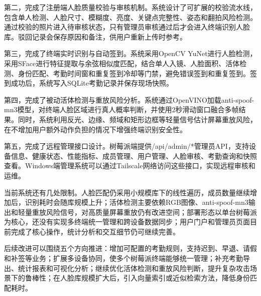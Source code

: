 \documentclass[UTF8]{heuthesis}
\begin{document}
第二，完成了注册端人脸质量校验与审核机制。系统设计了可扩展的校验流水线，包含单人检测、人脸尺寸、模糊度、亮度、关键点完整性、姿态和翻拍风险检测。通过校验的照片进入待审核状态，只有管理员审核通过后才会进入终端识别人脸库。驳回记录会保存原因和备注，供用户重新上传时参考。

第三，完成了终端实时识别与自动签到。系统采用OpenCV YuNet进行人脸检测，采用SFace进行特征提取与余弦相似度匹配，结合单人入镜、人脸面积、活体检测、身份匹配、考勤时间窗和重复签到冷却等门禁，避免错误签到和重复签到。签到成功后，系统写入SQLite考勤记录并保存现场快照。

第四，完成了被动活体检测与重放风险分析。系统通过OpenVINO加载anti-spoof-mn3模型，对终端人脸区域进行真人概率判断，并使用2秒滑动窗口融合多帧结果。同时，系统利用反光、边缘、频域和矩形边框等轻量信号估计屏幕重放风险，在不增加用户额外动作负担的情况下增强终端识别安全性。

第五，完成了远程管理接口设计。树莓派端提供/api/admin/*管理员API，支持设备信息、健康状态、性能指标、成员管理、用户管理、人脸审核、考勤查询和快照查看。Windows端管理系统可以通过Tailscale网络访问这些接口，实现远程审核和运维。

当前系统还有几处限制。人脸匹配仍采用小规模库下的线性遍历，成员数量继续增加后，识别耗时会随库规模上升；活体检测主要依赖RGB图像、anti-spoof-mn3输出和轻量重放风险信号，对高质量屏幕重放仍有改进空间；部署形态以单台树莓派为核心，还没有实现多终端统一管理和跨设备数据同步；用户门户和管理员页面目前完成了核心操作，统计分析和交互细节仍可继续完善。

后续改进可以围绕五个方向推进：增加可配置的考勤规则，支持迟到、早退、请假和补签等业务；扩展多设备协同，使多个树莓派终端能够统一管理；补充考勤导出、统计报表和可视化分析；继续优化活体检测和重放风险判断，提升复杂攻击场景下的鲁棒性；在人脸库规模扩大后，引入向量索引或近似检索方法，降低身份匹配耗时。
\end{document}
